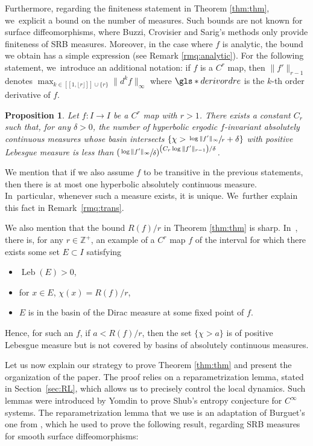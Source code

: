 \documentclass[11pt]{article}
\DeclareMathOperator{\Leb}{Leb}
\let\rC C
\newtheorem{proptitle}[thmtitle]{Proposition}
\theoremstyle{definition}
\newcommand{\bbZ}{{\mathbb{Z}}}
\begin{document}
Furthermore, regarding the finiteness statement in Theorem \ref{thm:thm}, we~explicit a bound on the number of measures.
Such bounds are not known for surface diffeomorphisms, where Buzzi, Crovisier and Sarig's methods \cite{BCS_mme} only provide finiteness of SRB measures. Moreover, in the case where $f$ is analytic, the bound we obtain has a simple expression (see Remark \ref{rmq:analytic}).
For the following statement, we~introduce an additional notation: if $f$ is a $\rC^r$ map, then $\| f' \|_{r-1}$ denotes $\max_{k \in [\![ 1, \lfloor r \rfloor ]\!] \cup \{ r \}} \| d^k f \|_{\infty}$ where $\gls*{derivordre}$ is the $k$-th order derivative of $f$.

\begin{proptitle}
\label{prop:title}
Let $f : I \to I$ be a $\rC^r$ map with $r > 1$.
There exists a constant $C_r$ such that, for any $\delta > 0$, the number of hyperbolic ergodic $f$\nobreakdash-invariant absolutely continuous measures whose basin intersects $\left \{ \chi > \sfrac{\log \| f' \|_{\infty}}{r} + \delta \right \}$
with positive Lebesgue measure is less than
$
\left (\sfrac{\log \| f' \|_{\infty}}{\delta} \right)^{\left (C_r \log \| f' \|_{r-1} \right) / \delta}
$.
\end{proptitle}

We mention that if we also assume $f$ to be transitive in the previous statements, then there is at most one hyperbolic absolutely continuous measure. In~particular, whenever such a measure exists, it is unique. We~further explain this fact in Remark~\ref{rmq:trans}.

We also mention that the bound $R(f) /r$ in Theorem \ref{thm:thm} is sharp. In~\cite[App.\,A]{BurguetCMP}, there is, for any $r \in \bbZ^+$, an example of a $\rC^r$ map $f$ of the interval for which there exists some set $E \subset I$ satisfying
\begin{itemize}
\item
$\Leb(E) > 0$,
\item
for $x \in E$, $\chi(x) = R(f) / r$,
\item
$E$ is in the basin of the Dirac measure at some fixed point of $f$.
\end{itemize}
Hence, for such an $f$, if $a < R(f) / r$, then the set $\{ \chi > a \}$ is of positive Lebesgue measure but is not covered by basins of absolutely continuous measures.

Let us now explain our strategy to prove Theorem \ref{thm:thm} and present the organization of the paper.
The proof relies on a reparametrization lemma, stated in Section~\ref{sec:RL}, which allows us to precisely control the local dynamics.
Such lemmas were introduced by Yomdin \cite{Yomdin1987VolumeGA} to prove Shub's entropy conjecture for $\rC^{\infty}$ systems.
The reparametrization lemma that we use is an adaptation of Burguet's one from \cite{MR4701884}, which he used to prove the following result, regarding SRB measures for smooth surface diffeomorphisms:
\end{document}
